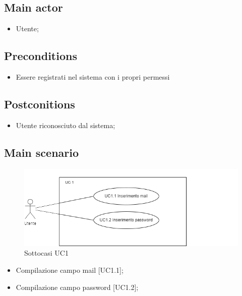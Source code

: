 \documentclass{article}
\begin{document}
     \subsection*{Main actor}
         \begin{itemize}
             \item Utente;
         \end{itemize}
     \subsection*{Preconditions} 
        \begin{itemize}
            \item Essere registrati nel sistema con i propri permessi
        \end{itemize}
               
    \subsection*{Postconitions}
        \begin{itemize}
            \item Utente riconosciuto dal sistema;
        \end{itemize}
    \subsection*{Main scenario}
        \begin{figure}[h]
            \centering
            \includegraphics{./imgUML/UC1-zoom.png}
            \caption{Sottocasi UC1}
            \label{fig:UC1_sottocasi}
        \end{figure}
            
        \begin{itemize}
            \item Compilazione campo mail [UC1.1];
            \item Compilazione campo password [UC1.2];
        \end{itemize}
            
\end{document}
